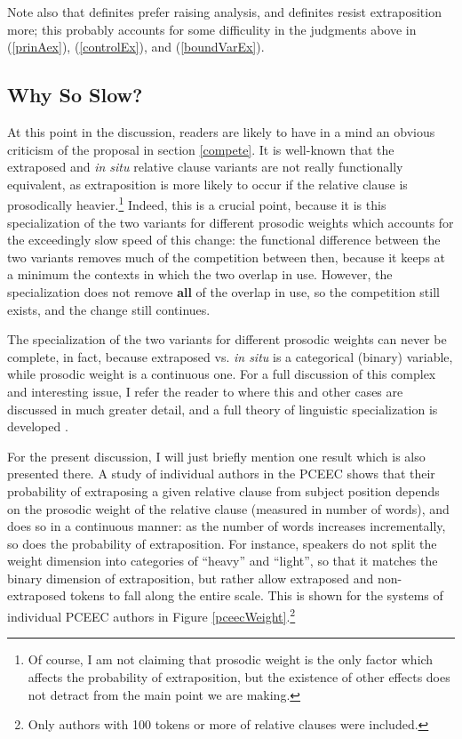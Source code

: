 Note also that definites prefer raising analysis, and definites resist extraposition more; this probably accounts for some difficulity in the judgments above in (\ref{prinAex}), (\ref{controlEx}), and (\ref{boundVarEx}). %

\subsection{Why So Slow?}
\label{slow}

At this point in the discussion, readers are likely to have in a mind an obvious criticism of the proposal in section \ref{compete}. It is well-known that the extraposed and \textsl{in situ} relative clause variants are not really functionally equivalent, as extraposition is more likely to occur if the relative clause is prosodically heavier.\footnote{Of course, I am not claiming that prosodic weight is the only factor which affects the probability of extraposition, but the existence of other effects does not detract from the main point we are making.} Indeed, this is a crucial point, because it is this specialization of the two variants for different prosodic weights which accounts for the exceedingly slow speed of this change: the functional difference between the two variants removes much of the competition between then, because it keeps at a minimum the contexts in which the two overlap in use. However, the specialization does not remove \textbf{all} of the overlap in use, so the competition still exists, and the change still continues.

The specialization of the two variants for different prosodic weights can never be complete, in fact, because extraposed vs. \textsl{in situ} is a categorical (binary) variable, while prosodic weight is a continuous one. For a full discussion of this complex and interesting issue, I refer the reader to \citet{fruehwaldwallenberginprep} where this and other cases are discussed in much greater detail, and a full theory of linguistic specialization is developed \citep[see also][]{fruehwaldwallenberg2013, wallenberg2013b}.

For the present discussion, I will just briefly mention one result which is also presented there. A study of individual authors in the PCEEC shows that their probability of extraposing a given relative clause from subject position depends on the prosodic weight of the relative clause (measured in number of words), and does so in a continuous manner: as the number of words increases incrementally, so does the probability of extraposition. For instance, speakers do not split the weight dimension into categories of ``heavy'' and ``light'', so that it matches the binary dimension of extraposition, but rather allow extraposed and non-extraposed tokens to fall along the entire scale. This is shown for the systems of individual PCEEC authors in Figure \ref{pceecWeight}.\footnote{Only authors with 100 tokens or more of relative clauses were included.}

